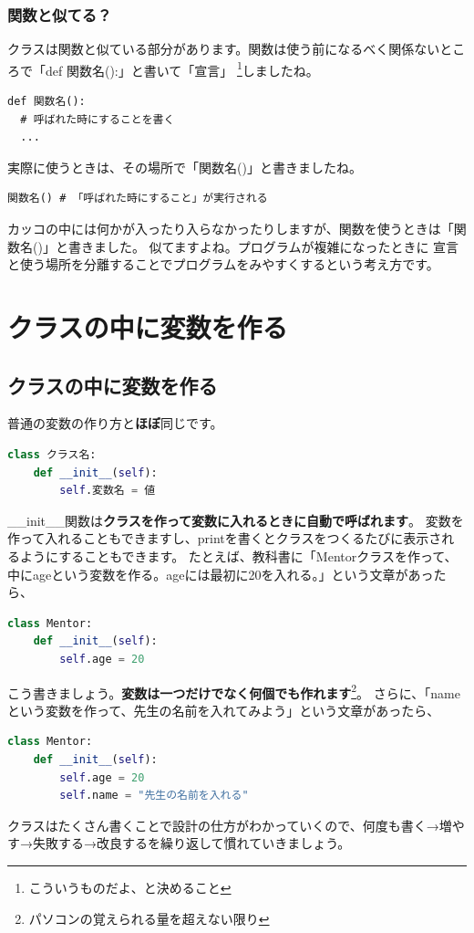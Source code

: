 \documentclass[12pt, a4paper, dvipdfmx]{book}
\begin{document}
\subsubsection{関数と似てる？}
クラスは関数と似ている部分があります。関数は使う前になるべく関係ないところで「def 関数名():」と書いて「宣言」
\footnote{こういうものだよ、と決めること}しましたね。
\begin{lstlisting}[caption=関数の作り方,label=sample]
def 関数名():
  # 呼ばれた時にすることを書く
  ...
\end{lstlisting}
実際に使うときは、その場所で「関数名()」と書きましたね。
\begin{lstlisting}[caption=関数の呼び出し方,label=sample]
関数名() # 「呼ばれた時にすること」が実行される
\end{lstlisting}
カッコの中には何かが入ったり入らなかったりしますが、関数を使うときは「関数名()」と書きました。
似てますよね。プログラムが複雑になったときに
宣言と使う場所を分離することでプログラムをみやすくするという考え方です。

\section{クラスの中に変数を作る}
\subsection{クラスの中に変数を作る}
普通の変数の作り方と\textbf{ほぼ}同じです。
\begin{lstlisting}[caption=クラスの中に変数を作る,label=sample, language=Python]
class クラス名:
    def __init__(self):
        self.変数名 = 値
\end{lstlisting}
\_\_init\_\_関数は\textbf{クラスを作って変数に入れるときに自動で呼ばれます}。
変数を作って入れることもできますし、printを書くとクラスをつくるたびに表示されるようにすることもできます。
たとえば、教科書に「Mentorクラスを作って、中にageという変数を作る。ageには最初に20を入れる。」という文章があったら、
\begin{lstlisting}[caption=Mentorクラスの作り方,label=sample, language=Python]
class Mentor:
    def __init__(self):
        self.age = 20
\end{lstlisting}
こう書きましょう。\textbf{変数は一つだけでなく何個でも作れます}\footnote{パソコンの覚えられる量を超えない限り}。
さらに、「nameという変数を作って、先生の名前を入れてみよう」という文章があったら、
\begin{lstlisting}[caption=Mentorクラスの作り方,label=sample, language=Python]
class Mentor:
    def __init__(self):
        self.age = 20
        self.name = "先生の名前を入れる"
\end{lstlisting}
クラスはたくさん書くことで設計の仕方がわかっていくので、何度も書く→増やす→失敗する→改良するを繰り返して慣れていきましょう。
\end{document}
